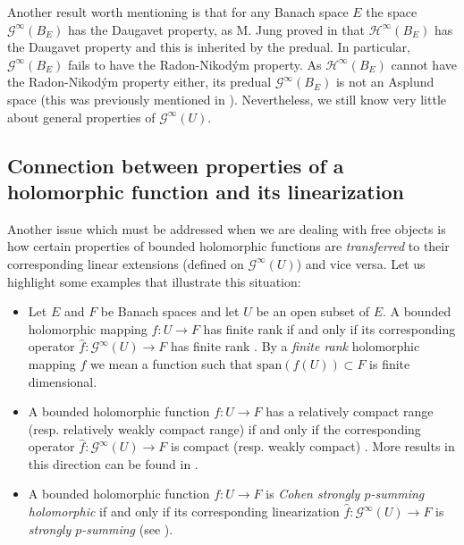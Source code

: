 \documentclass[12pt,leqno]{amsart}
\numberwithin{equation}{section} %
\theoremstyle{definition}
\numberwithin{equation}{section}
\begin{document}
Another result worth mentioning is that for any Banach space $E$ the space $\mathcal{G}^\infty(B_E)$ has the Daugavet property, as M. Jung proved in \cite[Corollary 2.3]{Jung} that $\mathcal{H}^\infty(B_E)$ has the Daugavet property and this is inherited by the predual. In particular, $\mathcal{G}^\infty(B_E)$ fails to have the Radon-Nikod\'ym property. As $\mathcal{H}^\infty(B_E)$ cannot have the Radon-Nikod\'ym property either, its predual $\mathcal{G}^\infty(B_E)$ is not an Asplund space (this was previously mentioned in \cite[Example 3.5]{GM}). Nevertheless, we still know very little about general properties of $\mathcal{G}^\infty(U)$.




\subsection{Connection between properties of a holomorphic function and its linearization}


Another issue which must be addressed when we are dealing with free objects is how certain properties of bounded holomorphic functions are \textit{transferred} to their corresponding linear extensions (defined on $\mathcal{G}^\infty(U)$) and vice versa. Let us highlight some examples that illustrate this situation:

\begin{itemize}
    \item Let $E$ and $F$ be Banach spaces and let $U$ be an open subset of $E$. A bounded holomorphic mapping $f:U\to F$ has finite rank if and only if its corresponding operator $\hat{f}:\mathcal{G}^\infty(U)\to F$ has finite rank \cite[Proposition 3.1]{Mujica91}. By a \textit{finite rank} holomorphic mapping $f$ we mean a function such that $\text{span}(f(U))\subset F$ is finite dimensional.

    \item A bounded holomorphic function $f:U\to F$ has a relatively compact range (resp. relatively weakly compact range) if and only if the corresponding operator $\hat{f}:\mathcal{G}^\infty(U)\to F$ is compact (resp. weakly compact) \cite[Proposition 3.4]{Mujica91}. More results in this direction can be found in \cite{J-VR-CS}.

    \item A bounded holomorphic function $f:U\to F$ is \textit{Cohen strongly $p$-summing holomorphic} if and only if its corresponding linearization $\hat{f}:\mathcal{G}^\infty(U)\to F$ is \textit{strongly $p$-summing} (see \cite{J-VSS}). 
\end{itemize}
\end{document}
